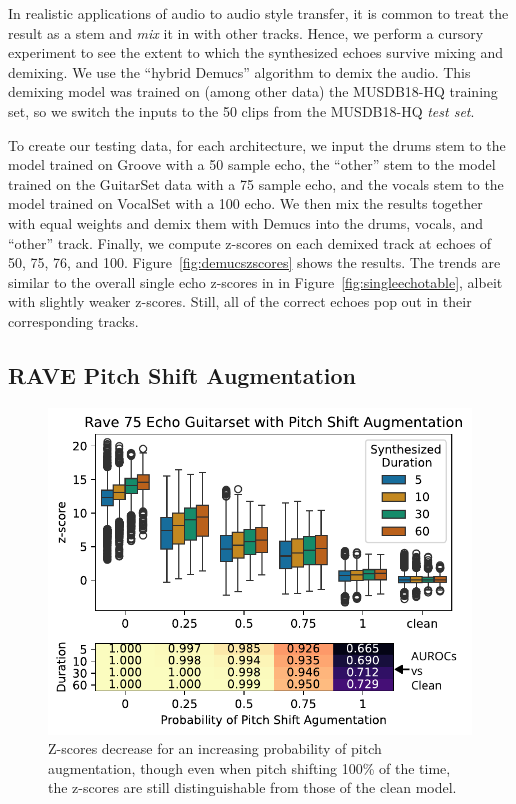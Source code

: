 \documentclass[letterpaper]{article} %
\begin{document}
In realistic applications of audio to audio style transfer, it is common to treat the result as a stem and {\em mix} it in with other tracks.  Hence, we perform a cursory experiment to see the extent to which the synthesized echoes survive mixing and demixing.  We use the ``hybrid Demucs'' algorithm \cite{defossez2019music} to demix the audio.  This demixing model was trained on (among other data) the MUSDB18-HQ training set, so we switch the inputs to the 50 clips from the MUSDB18-HQ {\em test set}.  

To create our testing data, for each architecture, we input the drums stem to the model trained on Groove with a 50 sample echo, the ``other'' stem to the model trained on the GuitarSet data with a 75 sample echo, and the vocals stem to the model trained on VocalSet with a 100 echo.  We then mix the results together with equal weights and demix them with Demucs into the drums, vocals, and ``other'' track.  Finally, we compute z-scores on each demixed track at echoes of 50, 75, 76, and 100.  Figure~\ref{fig:demucszscores} shows the results.  The trends are similar to the overall single echo z-scores in in Figure~\ref{fig:singleechotable}, albeit with slightly weaker z-scores.  Still, all of the correct echoes pop out in their corresponding tracks.


\subsection{RAVE Pitch Shift Augmentation}

\begin{figure}
    \centering
    \includegraphics[width=\columnwidth]{figs/RavePercPitchShift.pdf}
    \caption{Z-scores decrease for an increasing probability of pitch augmentation, though even when pitch shifting 100\% of the time, the z-scores are still distinguishable from those of the clean model.}
    \label{fig:pitchshiftaugmentation}
\end{figure}
\end{document}
